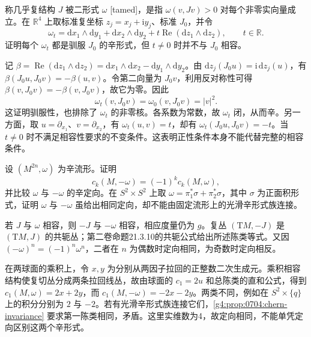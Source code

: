 \begin{exercise}\label{g4:ex:0703:tamed-not-compatible}
	称几乎复结构 \(J\) 被二形式 \(\omega\) [tamed]，是指 \(\omega(v,Jv)>0\) 对每个非零实向量成立。在 \(\mathbb R^4\) 上取标准复坐标 \(z_j=x_j+\mathrm{i}y_j\)、标准 \(J_0\)，并令
	\[
		\omega_t=\mathrm{d}x_1\wedge\mathrm{d}y_1+\mathrm{d}x_2\wedge\mathrm{d}y_2
		+t\operatorname{Re}(\mathrm{d}z_1\wedge\mathrm{d}z_2),\qquad t\in\mathbb R.
	\]
	证明每个 \(\omega_t\) 都是驯服 \(J_0\) 的辛形式，但 \(t\ne0\) 时并不与 \(J_0\) 相容。
\end{exercise}
\begin{solution}
	记 \(\beta=\operatorname{Re}(\mathrm{d}z_1\wedge\mathrm{d}z_2)=\mathrm{d}x_1\wedge\mathrm{d}x_2-\mathrm{d}y_1\wedge\mathrm{d}y_2\)。由 \(\mathrm{d}z_j(J_0u)=\mathrm{i}\,\mathrm{d}z_j(u)\)，有 \(\beta(J_0u,J_0v)=-\beta(u,v)\)。令第二向量为 \(J_0v\)，利用反对称性可得 \(\beta(v,J_0v)=-\beta(v,J_0v)\)，故它为零。因此
	\[
		\omega_t(v,J_0v)=\omega_0(v,J_0v)=|v|^2.
	\]
	这证明驯服性，也排除了 \(\omega_t\) 的非零核。各系数为常数，故 \(\omega_t\) 闭，从而辛。另一方面，取 \(u=\partial_{x_1}\)、\(v=\partial_{x_2}\)，有 \(\omega_t(u,v)=t\)，却有 \(\omega_t(J_0u,J_0v)=-t\)。当 \(t\ne0\) 时不满足相容性要求的不变条件。这表明正性条件本身不能代替完整的相容条件。
\end{solution}

\begin{exercise}\label{g4:ex:0704:reverse-form}
	设 \((M^{2n},\omega)\) 为辛流形。证明
	\[
		c_k(M,-\omega)=(-1)^k c_k(M,\omega),
	\]
	并比较 \(\omega\) 与 \(-\omega\) 的辛定向。在 \(S^2\times S^2\) 上取 \(\omega=\pi_1^*\sigma+\pi_2^*\sigma\)，其中 \(\sigma\) 为正面积形式，证明 \(\omega\) 与 \(-\omega\) 虽给出相同定向，却不能由固定流形上的光滑辛形式族连接。
\end{exercise}
\begin{solution}
	若 \(J\) 与 \(\omega\) 相容，则 \(-J\) 与 \(-\omega\) 相容，相应度量仍为 \(g\)。复丛 \((\mathrm{T}M,-J)\) 是 \((\mathrm{T}M,J)\) 的共轭丛；第二卷命题21.3.10的共轭公式给出所述陈类等式。又因 \((-\omega)^n=(-1)^n\omega^n\)，二者在 \(n\) 为偶数时定向相同，为奇数时定向相反。

	在两球面的乘积上，令 \(x,y\) 为分别从两因子拉回的正整数二次生成元。乘积相容结构使复切丛分成两条拉回线丛，故由球面的 \(c_1=2u\) 和总陈类的直和公式，得到 \(c_1(M,\omega)=2x+2y\)，而 \(c_1(M,-\omega)=-2x-2y\)。两类不同，例如在 \(S^2\times\{q\}\) 上的积分分别为 \(2\) 与 \(-2\)。若有光滑辛形式族连接它们，\cref{g4:prop:0704:chern-invariance} 要求第一陈类相同，矛盾。这里实维数为4，故定向相同，不能单凭定向区别这两个辛形式。
\end{solution}

